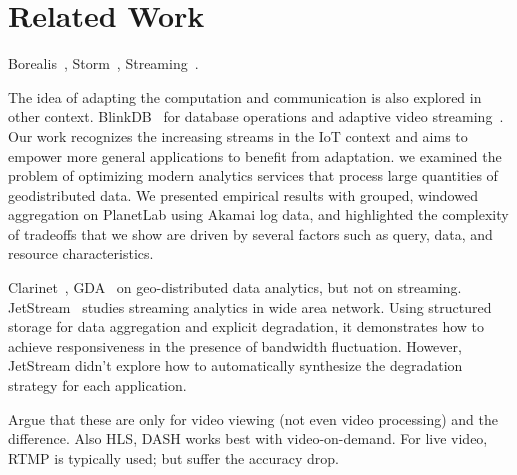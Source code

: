 \section{Related Work}
\label{sec:related-work}

 Borealis~\cite{abadi2005design},
Storm~\cite{toshniwal2014storm}, Streaming~\cite{zaharia2012discretized}.

 The idea of adapting the computation and
communication is also explored in other
context. BlinkDB~\cite{agarwal2013blinkdb} for database operations and adaptive
video streaming~\cite{yin2015control}. Our work recognizes the increasing
streams in the IoT context and aims to empower more general applications to
benefit from adaptation. \cite{heintz2015towards} we examined the problem of
optimizing modern analytics services that process large quantities of
geodistributed data. We presented empirical results with grouped, windowed
aggregation on PlanetLab using Akamai log data, and highlighted the complexity
of tradeoffs that we show are driven by several factors such as query, data, and
resource characteristics.

 Clarinet~\cite{viswanathan2016clarinet}, GDA~\cite{pu2015low}
on geo-distributed data analytics, but not on
streaming. JetStream~\cite{rabkin2014aggregation} studies streaming analytics in
wide area network. Using structured storage for data aggregation and explicit
degradation, it demonstrates how to achieve responsiveness in the presence of
bandwidth fluctuation. However, JetStream didn't explore how to automatically
synthesize the degradation strategy for each application.

 Argue that these are only for video viewing (not even
video processing) and the difference. Also HLS, DASH works best with
video-on-demand. For live video, RTMP is typically used; but suffer the accuracy
drop.

